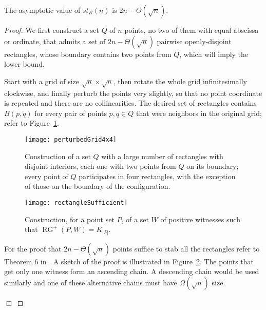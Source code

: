 \documentclass{llncs}
\DeclareMathOperator{\RG}{RG} \DeclareMathOperator{\RIG}{RIG} \DeclareMathOperator{\MNG}{MNG} \DeclareMathOperator{\GG}{GG} \DeclareMathOperator{\DG}{DG} \DeclareMathOperator{\WRG}{WRG}
\begin{document}
\begin{theorem} \label{thm:stabbingRectangles}
  The asymptotic value of $st_R(n)$ is $2n-\Theta(\sqrt{n})$.
\end{theorem}
\begin{proof}
  We first construct a set $Q$ of $n$ points, no two of them with
  equal abscissa or ordinate, that admits a set of $2n-\Theta(\sqrt
  n)$ pairwise openly-disjoint rectangles, whose boundary contains two
  points from $Q$, which will imply the lower bound.

  Start with a grid of size $\sqrt n\times\sqrt n$, then rotate the
  whole grid infinitesimally clockwise, and finally perturb the points
  very slightly, so that no point coordinate is repeated and there are
  no collinearities.  The desired set of rectangles contains $B(p,q)$
  for every pair of points $p,q \in Q$ that were neighbors in the
  original grid; refer to Figure~\ref{fig:pairwiseDisjointRectangles}.

\begin{figure}[htbp!]
  \centering
  \texttt{[image: perturbedGrid4x4]}\caption{Construction of a set $Q$ with a large number of rectangles
    with disjoint interiors, each one with two points from $Q$ on its
    boundary; every point of $Q$ participates in four rectangles, with
    the exception of those on the boundary of the configuration.}
  \label{fig:pairwiseDisjointRectangles}
\end{figure}

 \begin{figure}[htbp!]
  \centering
  \texttt{[image: rectangleSufficient]}
  \caption{Construction, for a point set $P$, of a set $W$ of positive
    witnesses such that $\RG^+(P,W)=K_{|P|}$.}
  \label{fig:pairwiseDisjointRectangles2}
\end{figure}


For the proof that $2n-\Theta(\sqrt{n})$ points suffice to stab all the rectangles refer to Theorem 6 in \cite{ADH}. A sketch of the proof is
illustrated in Figure~\ref{fig:pairwiseDisjointRectangles2}. The points that get only one witness form an ascending chain.
A descending chain would be used similarly and one of these alternative chains must have
$\Omega(\sqrt{n})$ size.

\hfill $\Box$





\end{proof}
  
\end{document}
